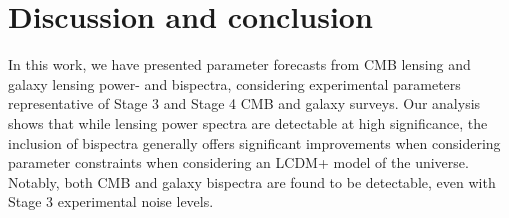 \documentclass[11pt]{article} %
\begin{document}


\pagebreak



\section{Discussion and conclusion}\label{sec:discussion}
In this work, we have presented parameter forecasts from CMB lensing and galaxy lensing power- and bispectra, considering experimental parameters representative of Stage 3 and Stage 4 CMB and galaxy surveys. Our analysis shows that while lensing power spectra are detectable at high significance, the inclusion of bispectra generally offers significant improvements when considering parameter constraints when considering an LCDM+ model of the universe. Notably, both CMB and galaxy bispectra are found to be detectable, even with Stage 3 experimental noise levels.
\end{document}

